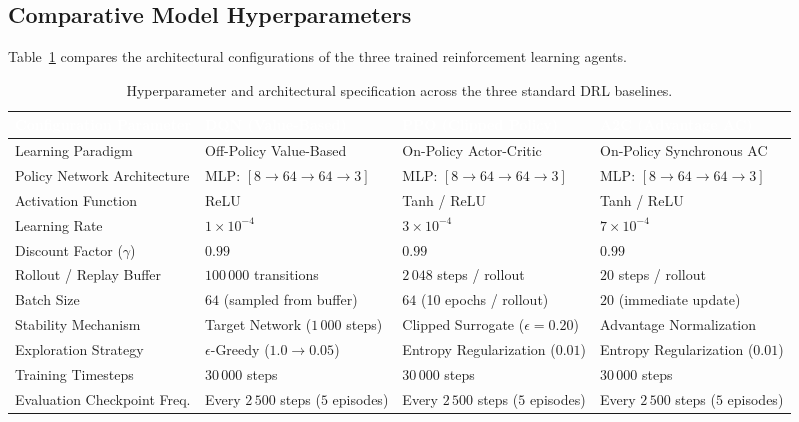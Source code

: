 \documentclass[11pt,a4paper]{article}
\begin{document}
\subsection{Comparative Model Hyperparameters}
Table~\ref{tab:model_hyperparameters} compares the architectural configurations of the three trained reinforcement learning agents.

\begin{table}[tbp]
\centering
\footnotesize
\renewcommand{\arraystretch}{1.25}
\begin{tabularx}{\textwidth}{p{3.8cm} >{\centering\arraybackslash}X >{\centering\arraybackslash}X >{\centering\arraybackslash}X}
\toprule
\rowcolor{tableheader}
\textcolor{white}{\textbf{Configuration Parameter}} & \textcolor{white}{\textbf{DQN (Value-Based)}} & \textcolor{white}{\textbf{PPO (Clipped Policy)}} & \textcolor{white}{\textbf{A2C (Advantage AC)}} \\
\midrule
Learning Paradigm & Off-Policy Value-Based & On-Policy Actor-Critic & On-Policy Synchronous AC \\
Policy Network Architecture & MLP: $[8 \to 64 \to 64 \to 3]$ & MLP: $[8 \to 64 \to 64 \to 3]$ & MLP: $[8 \to 64 \to 64 \to 3]$ \\
Activation Function & ReLU & Tanh / ReLU & Tanh / ReLU \\
Learning Rate & $1 \times 10^{-4}$ & $3 \times 10^{-4}$ & $7 \times 10^{-4}$ \\
Discount Factor ($\gamma$) & $0.99$ & $0.99$ & $0.99$ \\
Rollout / Replay Buffer & $100\,000$ transitions & $2\,048$ steps / rollout & $20$ steps / rollout \\
Batch Size & $64$ (sampled from buffer) & $64$ (10 epochs / rollout) & $20$ (immediate update) \\
Stability Mechanism & Target Network ($1\,000$ steps) & Clipped Surrogate ($\epsilon = 0.20$) & Advantage Normalization \\
Exploration Strategy & $\epsilon$-Greedy ($1.0 \to 0.05$) & Entropy Regularization ($0.01$) & Entropy Regularization ($0.01$) \\
Training Timesteps & $30\,000$ steps & $30\,000$ steps & $30\,000$ steps \\
Evaluation Checkpoint Freq. & Every $2\,500$ steps ($5$ episodes) & Every $2\,500$ steps ($5$ episodes) & Every $2\,500$ steps ($5$ episodes) \\
\bottomrule
\end{tabularx}
\caption{Hyperparameter and architectural specification across the three standard DRL baselines.}
\label{tab:model_hyperparameters}
\end{table}
\end{document}
